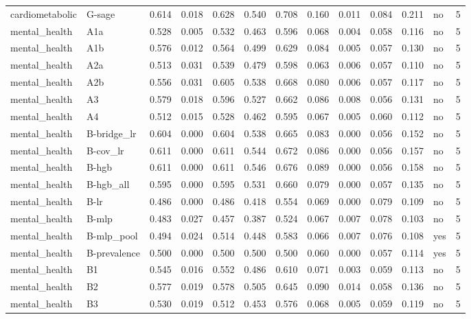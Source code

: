 \begin{table}[t]
\begin{tabular}{lllllllllllll}
cardiometabolic & G-sage & 0.614 & 0.018 & 0.628 & 0.540 & 0.708 & 0.160 & 0.011 & 0.084 & 0.211 & no & 5 \\
mental\_health & A1a & 0.528 & 0.005 & 0.532 & 0.463 & 0.596 & 0.068 & 0.004 & 0.058 & 0.116 & no & 5 \\
mental\_health & A1b & 0.576 & 0.012 & 0.564 & 0.499 & 0.629 & 0.084 & 0.005 & 0.057 & 0.130 & no & 5 \\
mental\_health & A2a & 0.513 & 0.031 & 0.539 & 0.479 & 0.598 & 0.063 & 0.006 & 0.057 & 0.110 & no & 5 \\
mental\_health & A2b & 0.556 & 0.031 & 0.605 & 0.538 & 0.668 & 0.080 & 0.006 & 0.057 & 0.117 & no & 5 \\
mental\_health & A3 & 0.579 & 0.018 & 0.596 & 0.527 & 0.662 & 0.086 & 0.008 & 0.056 & 0.131 & no & 5 \\
mental\_health & A4 & 0.512 & 0.015 & 0.528 & 0.462 & 0.595 & 0.067 & 0.005 & 0.060 & 0.112 & no & 5 \\
mental\_health & B-bridge\_lr & 0.604 & 0.000 & 0.604 & 0.538 & 0.665 & 0.083 & 0.000 & 0.056 & 0.152 & no & 5 \\
mental\_health & B-cov\_lr & 0.611 & 0.000 & 0.611 & 0.544 & 0.672 & 0.086 & 0.000 & 0.056 & 0.157 & no & 5 \\
mental\_health & B-hgb & 0.611 & 0.000 & 0.611 & 0.546 & 0.676 & 0.089 & 0.000 & 0.056 & 0.158 & no & 5 \\
mental\_health & B-hgb\_all & 0.595 & 0.000 & 0.595 & 0.531 & 0.660 & 0.079 & 0.000 & 0.057 & 0.135 & no & 5 \\
mental\_health & B-lr & 0.486 & 0.000 & 0.486 & 0.418 & 0.554 & 0.069 & 0.000 & 0.079 & 0.109 & no & 5 \\
mental\_health & B-mlp & 0.483 & 0.027 & 0.457 & 0.387 & 0.524 & 0.067 & 0.007 & 0.078 & 0.103 & no & 5 \\
mental\_health & B-mlp\_pool & 0.494 & 0.024 & 0.514 & 0.448 & 0.583 & 0.066 & 0.007 & 0.076 & 0.108 & yes & 5 \\
mental\_health & B-prevalence & 0.500 & 0.000 & 0.500 & 0.500 & 0.500 & 0.060 & 0.000 & 0.057 & 0.114 & yes & 5 \\
mental\_health & B1 & 0.545 & 0.016 & 0.552 & 0.486 & 0.610 & 0.071 & 0.003 & 0.059 & 0.113 & no & 5 \\
mental\_health & B2 & 0.577 & 0.019 & 0.578 & 0.505 & 0.645 & 0.090 & 0.014 & 0.058 & 0.136 & no & 5 \\
mental\_health & B3 & 0.530 & 0.019 & 0.512 & 0.453 & 0.576 & 0.068 & 0.005 & 0.059 & 0.119 & no & 5 \\

\end{tabular}
\end{table}
